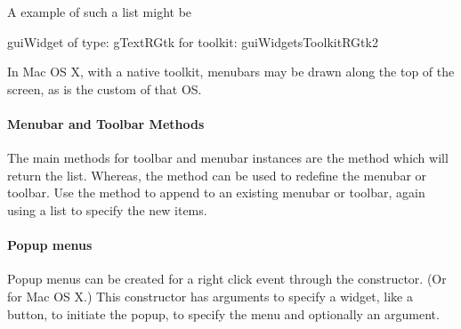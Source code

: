 A example of such a list might be
\begin{Schunk}
\end{Schunk}

\begin{Schunk}
\begin{Soutput}
guiWidget of type: gTextRGtk for toolkit: guiWidgetsToolkitRGtk2 
\end{Soutput}
\end{Schunk}


In Mac OS X, with a native toolkit, menubars may be drawn along the top
of the screen, as is the custom of that OS. 

\paragraph{Menubar and Toolbar Methods}
The main methods for toolbar and menubar instances are
the  method which will return the list. Whereas, the
 method can be used to redefine the
menubar or toolbar. Use the  method to append to an
existing menubar or toolbar, again using a list to specify the new items.



\paragraph{Popup menus}

Popup menus can be created for a right click event through the
 constructor. (Or
 for Mac OS X.) This constructor has arguments
 to specify a widget, like a button, to initiate the popup,
 to specify the menu and optionally an
 argument.


